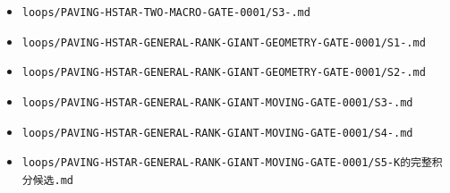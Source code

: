 \documentclass[10pt]{article}
\begin{document}
\begin{itemize}
\item \texttt{loops/\allowbreak{}PAVING-\allowbreak{}HSTAR-\allowbreak{}TWO-\allowbreak{}MACRO-\allowbreak{}GATE-\allowbreak{}0001/\allowbreak{}S3-.\allowbreak{}md}
\item \texttt{loops/\allowbreak{}PAVING-\allowbreak{}HSTAR-\allowbreak{}GENERAL-\allowbreak{}RANK-\allowbreak{}GIANT-\allowbreak{}GEOMETRY-\allowbreak{}GATE-\allowbreak{}0001/\allowbreak{}S1-.\allowbreak{}md}
\item \texttt{loops/\allowbreak{}PAVING-\allowbreak{}HSTAR-\allowbreak{}GENERAL-\allowbreak{}RANK-\allowbreak{}GIANT-\allowbreak{}GEOMETRY-\allowbreak{}GATE-\allowbreak{}0001/\allowbreak{}S2-.\allowbreak{}md}
\item \texttt{loops/\allowbreak{}PAVING-\allowbreak{}HSTAR-\allowbreak{}GENERAL-\allowbreak{}RANK-\allowbreak{}GIANT-\allowbreak{}MOVING-\allowbreak{}GATE-\allowbreak{}0001/\allowbreak{}S3-.\allowbreak{}md}
\item \texttt{loops/\allowbreak{}PAVING-\allowbreak{}HSTAR-\allowbreak{}GENERAL-\allowbreak{}RANK-\allowbreak{}GIANT-\allowbreak{}MOVING-\allowbreak{}GATE-\allowbreak{}0001/\allowbreak{}S4-.\allowbreak{}md}
\item \texttt{loops/\allowbreak{}PAVING-\allowbreak{}HSTAR-\allowbreak{}GENERAL-\allowbreak{}RANK-\allowbreak{}GIANT-\allowbreak{}MOVING-\allowbreak{}GATE-\allowbreak{}0001/\allowbreak{}S5-K{\cjkfont 的\allowbreak{}完\allowbreak{}整\allowbreak{}积\allowbreak{}分\allowbreak{}候\allowbreak{}选}.\allowbreak{}md}

\end{itemize}
\end{document}
